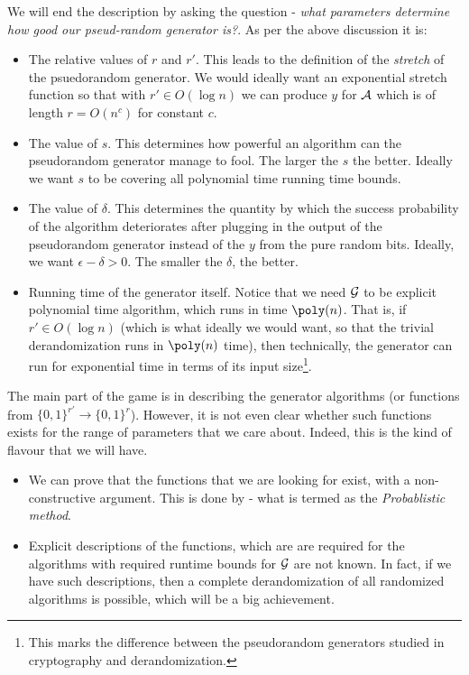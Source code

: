 \noindent We will end the description by asking the question - {\em what parameters determine how good our pseud-random generator is?}. As per the above discussion it is:
\begin{itemize}
\item The relative values of $r$ and $r'$. This leads to the definition of the {\em stretch} of the psuedorandom generator. We would ideally want an exponential stretch function so that with $r' \in O(\log n)$ we can produce $y$ for ${\cal{A}}$ which is of length $r = O(n^c)$ for constant $c$.
\item The value of $s$. This determines how powerful an algorithm can the pseudorandom generator manage to fool. The larger the $s$ the better. Ideally we want $s$ to be covering all polynomial time running time bounds.
\item The value of $\delta$. This determines the quantity by which the success probability of the algorithm deteriorates after plugging in the output of the pseudorandom generator instead of the $y$ from the pure random bits. Ideally, we want $\epsilon-\delta > 0$. The smaller the $\delta$, the better.
\item Running time of the generator itself. Notice that we need ${\cal{G}}$ to be explicit polynomial time algorithm, which runs in time $\poly(n)$. That is, if $r' \in O(\log n)$ (which is what ideally we would want, so that the trivial derandomization runs in $\poly(n)$ time), then technically, the generator can run for exponential time in terms of its input size\footnote{This marks the difference between the pseudorandom generators studied in cryptography and derandomization.}.
\end{itemize}

\noindent The main part of the game is in describing the generator algorithms (or functions from $\{0,1\}^{r'} \to \{0,1\}^r$). However, it is not even clear whether such functions exists for the range of parameters that we care about. Indeed, this is the kind of flavour that we will have.
\begin{itemize}
\item We can prove that the functions that we are looking for exist, with a non-constructive argument. This is done by - what is termed as the {\em Probablistic method}.
\item Explicit descriptions of the functions, which are are required for the algorithms with required runtime bounds for ${\cal{G}}$ are not known. In fact, if we have such descriptions, then a complete derandomization of all randomized algorithms is possible, which will be a big achievement.
\end{itemize}

